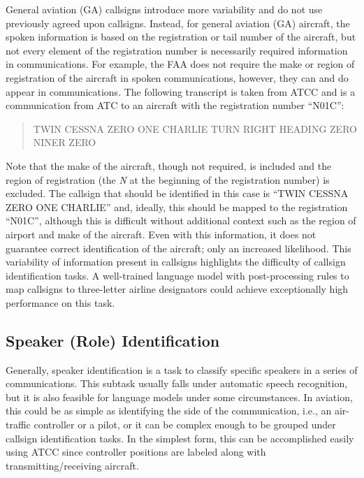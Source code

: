 \documentclass[12pt]{article}
\begin{document}
General aviation (GA) callsigns introduce more variability and do not use previously agreed upon callsigns. Instead, for general aviation (GA)
aircraft, the spoken information is based on the registration or tail number of the aircraft, but not every element of the registration number is
necessarily required information in communications. For example, the FAA does not require the make or region of registration of the aircraft in spoken
communications, however, they can and do appear in communications. The following transcript is taken from ATCC and is a communication from ATC to an
aircraft with the registration number ``N01C'':

\begin{quote}
    TWIN CESSNA ZERO ONE CHARLIE TURN RIGHT HEADING ZERO NINER ZERO
\end{quote}

\noindent
Note that the make of the aircraft, though not required, is included and the region of registration (the \textit{N} at the beginning of the
registration number) is excluded. The callsign that should be identified in this case is ``TWIN CESSNA ZERO ONE CHARLIE'' and, ideally, this should
be mapped to the registration ``N01C'', although this is difficult without additional context such as the region of airport and make of the aircraft.
Even with this information, it does not guarantee correct identification of the aircraft; only an increased likelihood. This variability of
information present in callsigns highlights the difficulty of callsign identification tasks. A well-trained language model with post-processing rules
to map callsigns to three-letter airline designators could achieve exceptionally high performance on this task.

\subsection{Speaker (Role) Identification}
Generally, speaker identification is a task to classify specific speakers in a series of communications. This subtask
usually falls under automatic speech recognition, but it is also feasible for language models under some circumstances. In aviation, this could be as
simple as identifying the side of the communication, i.e., an air-traffic controller or a pilot, or it can be complex enough to be grouped under
callsign identification tasks. In the simplest form, this can be accomplished easily using ATCC since controller positions are labeled along with
transmitting/receiving aircraft.
\end{document}
